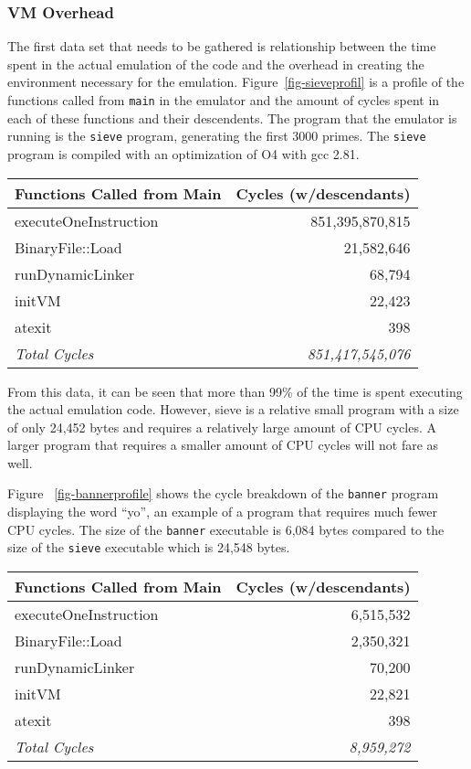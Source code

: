 \subsubsection{VM Overhead}

The first data set that needs to be gathered is relationship between the time
spent in the actual emulation of the code and the overhead in creating the 
environment necessary for the emulation.  Figure~\ref{fig-sieveprofil} is a 
profile of the functions called from \verb!main! in the emulator and the 
amount of cycles spent in each of these functions and their descendents. 
The program that the emulator is running is the \verb!sieve! program, 
generating the first 3000 primes. The \verb!sieve! program is compiled with 
an optimization of O4 with gcc 2.81.

\centerfigbegin
{
\begin{tabular}{|l|r|} \hline
Functions Called from Main	& Cycles (w/descendants)  \\ \hline
executeOneInstruction	& 851,395,870,815  \\
BinaryFile::Load	& 21,582,646	\\
runDynamicLinker	& 68,794		\\
initVM			& 22,423		\\
atexit			& 398		\\
\hline
\emph{Total Cycles}	& \emph{851,417,545,076} \\
\hline
\end{tabular}
}

From this data, it can be seen that more than 99\% of the time is spent 
executing the actual emulation code. However, sieve is a relative small 
program with a size of only 24,452 bytes and requires a relatively large 
amount of CPU cycles. A larger program that requires a smaller amount of 
CPU cycles will not fare as well.  

Figure ~\ref{fig-bannerprofile} shows the cycle breakdown of the \verb!banner! 
program displaying the word ``yo'', an example of a program that requires much 
fewer CPU cycles. The size of the \verb!banner! executable is 6,084 bytes 
compared to the size of the \verb!sieve! executable which is 24,548 bytes.

\centerfigbegin
{
\begin{tabular}{|l|r|} \hline
Functions Called from Main	& Cycles (w/descendants)  \\ \hline
executeOneInstruction	& 6,515,532  \\
BinaryFile::Load	& 2,350,321	\\
runDynamicLinker	& 70,200		\\
initVM			& 22,821		\\
atexit			& 398		\\
\hline
\emph{Total Cycles}	& \emph{8,959,272} \\
\hline
\end{tabular}
}

